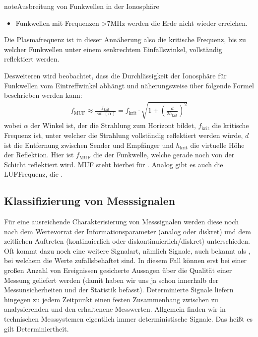 \documentclass[letterpaper,10pt,english]{jupyterBook}
\begin{document}
\begin{sphinxadmonition}{note}{Ausbreitung von Funkwellen in der Ionosphäre}
\begin{itemize}
\item {} 
\sphinxAtStartPar
Funkwellen mit Frequenzen >7MHz werden die Erde nicht wieder erreichen.

\end{itemize}

\sphinxAtStartPar
Die Plasmafrequenz ist in dieser Annäherung also die kritische Frequenz, bis zu welcher Funkwellen unter einem senkrechtem Einfallswinkel, vollständig reflektiert werden.

\sphinxAtStartPar
Desweiteren wird beobachtet, dass die Durchlässigkeit der Ionosphäre für Funkwellen vom Eintreffwinkel abhängt und näherungsweise über folgende Formel beschrieben werden kann:
\begin{equation*}
\begin{split}f_\mathrm{MUF} \approx \frac{f_\mathrm{krit}}{\sin(\alpha)} = f_\mathrm{krit} \cdot \sqrt{1 + \left(\frac{d}{2 h_\mathrm{krit}}\right)^2}\end{split}
\end{equation*}
\sphinxAtStartPar
wobei \(\alpha\) der Winkel ist, der die Strahlung zum Horizont bildet, \(f_\mathrm{krit}\) die kritische Frequenz ist, unter welcher die Strahlung vollständig reflektiert werden würde, \(d\) ist die Entfernung zwischen Sender und Empfänger und \(h_\mathrm{krit}\) die virtuelle Höhe der Reflektion. Hier ist \(f_\mathrm{MUF}\) die  der Funkwelle, welche gerade noch von der Schicht reflektiert wird. MUF steht hierbei für . Analog gibt es auch die LUF\sphinxhyphen{}Frequenz, die .
\end{sphinxadmonition}


\subsection{Klassifizierung von Messsignalen }
\label{\detokenize{content/3_basics:klassifizierung-von-messsignalen-a-id-subsec-klassifizierung-von-messsignalen-a}}
\sphinxAtStartPar
Für eine ausreichende Charakterisierung von Messsignalen werden diese noch nach dem Wertevorrat der Informationsparameter (analog oder diskret) und dem zeitlichen Auftreten (kontinuierlich oder diskontinuierlich/diskret) unterschieden. Oft kommt dazu noch eine weitere Signalart, nämlich  Signale, auch bekannt als , bei welchem die Werte zufallsbehaftet sind. In diesem Fall können erst bei einer großen Anzahl von Ereignissen gesicherte Aussagen über die Qualität einer Messung geliefert werden (damit haben wir uns ja schon innerhalb der Messunsicherheiten und der Statistik befasst).
Determinierte Signale liefern hingegen zu jedem Zeitpunkt einen festen Zusammenhang zwischen zu analysierenden und den erhaltenene Messwerten. Allgemein finden wir in technischen Messsystemen eigentlich immer deterministische Signale. Das heißt es gilt Determiniertheit.
\end{document}
